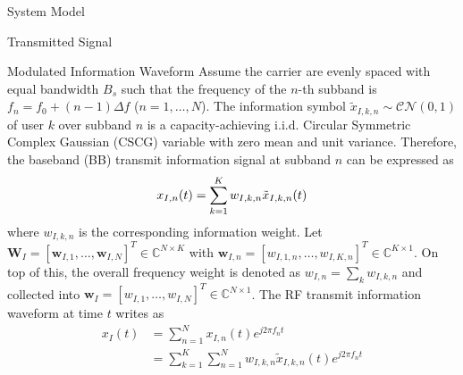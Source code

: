 \documentclass{IEEEtran}
\begin{document}
\begin{section}{System Model}
	\begin{subsection}{Transmitted Signal}
		\begin{subsubsection} {Modulated Information Waveform}
			Assume the carrier are evenly spaced with equal bandwidth $B_s$ such that the frequency of the $n$-th subband is $f_n=f_0+(n-1){\Delta}{f}$ ($n=1,\dots,N$). The information symbol $\tilde{x}_{I,k,n}\sim\mathcal{CN}(0,1)$ of user $k$ over subband $n$ is a capacity-achieving i.i.d. Circular Symmetric Complex Gaussian (CSCG) variable with zero mean and unit variance. Therefore, the baseband (BB) transmit information signal at subband $n$ can be expressed as
			\begin{equation}\label{eq:x_{I,n}(t)}
				x_{I,n}(t)=\sum_{k=1}^K{w_{I,k,n}\tilde{x}_{I,k,n}(t)}
			\end{equation}
			where $w_{I,k,n}$ is the corresponding information weight. Let $\boldsymbol{W}_I=[\boldsymbol{w}_{I,1},\dots,\boldsymbol{w}_{I,N}]^T \in \mathbb{C}^{N \times K}$ with $\boldsymbol{w}_{I,n}=[w_{I,1,n},\dots,w_{I,K,n}]^T \in \mathbb{C}^{K \times 1}$. On top of this, the overall frequency weight is denoted as $w_{I,n}=\sum_k{w_{I,k,n}}$ and collected into $\boldsymbol{w}_I=[w_{I,1},\dots,w_{I,N}]^T \in \mathbb{C}^{N \times 1}$. The RF transmit information waveform at time $t$ writes as
			\begin{equation}\label{eq:x_I(t)}
				\begin{split}
					x_I(t)
					&=\sum_{n=1}^N{x_{I,n}(t){e^{j2{\pi}{f_n}{t}}}}\\
					&=\sum_{k=1}^K\sum_{n=1}^N{w_{I,k,n}\tilde{x}_{I,k,n}(t){e^{j2{\pi}{f_n}{t}}}}
				\end{split}
			\end{equation}
		\end{subsubsection}


\end{subsection}
\end{section}
\end{document}
